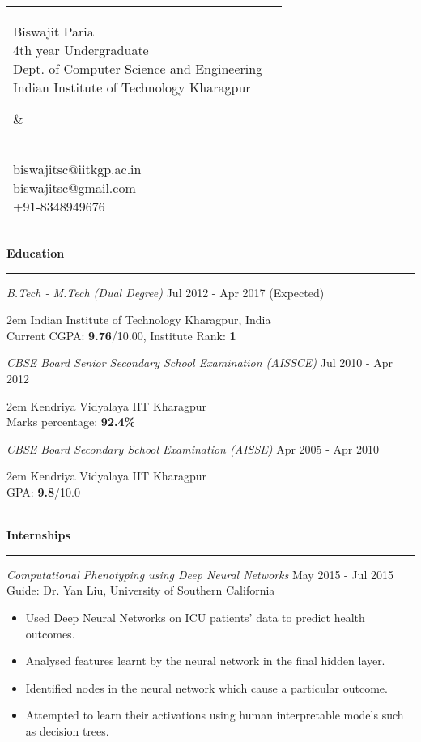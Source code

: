 \documentclass[a4paper,10pt,oneside]{article}
\makeatletter
\newcommand{\heading}[1]{
 {\Large \textbf{#1}}
  \vspace{0.4em}
  \hrule
  \vspace{0.4em}
}
\newcommand{\columnsplit}[4]{
  \begin{tabular*}{\textwidth}{l@{\cftdotfill{\cftsecdotsep}\extracolsep{\fill}}r}
   \parbox{#1}{
    \begin{flushleft}
     #2
    \end{flushleft}
   } &
   \parbox{#3}{
    \begin{flushright}
     #4
    \end{flushright}
   }
  \end{tabular*}
}
\newcommand{\SmallEntryGap}{ \vspace{0.6em} }
\newcommand{\EntryGap}{ ~\\ }
\newcommand{\doindent}[1]{\begin{adjustwidth}{2em}{} #1 \end{adjustwidth}}
\makeatother
\begin{document}


\columnsplit{4in}{
  {\huge Biswajit Paria}\\
  4th year Undergraduate\\
  Dept. of Computer Science and Engineering\\
  Indian Institute of Technology Kharagpur
  }
  {2in}{
  ~\\[1.3em]
  biswajitsc@iitkgp.ac.in\\
  biswajitsc@gmail.com\\
  +91-8348949676
  }

  


\heading{Education}

\SmallEntryGap
\emph{B.Tech - M.Tech (Dual Degree)} \hfill Jul 2012 - Apr 2017 (Expected)\\
  \doindent{Indian Institute of Technology Kharagpur, India\\
  Current CGPA: \textbf{9.76}/10.00, Institute Rank: \textbf{1}}

\SmallEntryGap
  \emph{CBSE Board Senior Secondary School Examination (AISSCE)} \hfill Jul 2010 - Apr 2012\\
  \doindent{Kendriya Vidyalaya IIT Kharagpur\\
  Marks percentage: \textbf{92.4\%}}

\SmallEntryGap
\emph{CBSE Board Secondary School Examination (AISSE)} \hfill Apr 2005 - Apr 2010\\
  \doindent{Kendriya Vidyalaya IIT Kharagpur\\
  GPA: \textbf{9.8}/10.0}

\EntryGap


\heading{Internships}
\SmallEntryGap
\emph{Computational Phenotyping using Deep Neural Networks} \hfill May 2015 - Jul 2015\\
Guide: Dr. Yan Liu, University of Southern California
\begin{itemize}[noitemsep, nolistsep]
 \item Used Deep Neural Networks on ICU patients' data to predict health outcomes.
 \item Analysed features learnt by the neural network in the final hidden layer.
 \item Identified nodes in the neural network which cause a particular outcome.
 \item Attempted to learn their activations using human interpretable models such as decision trees.
\end{itemize}
\end{document}

